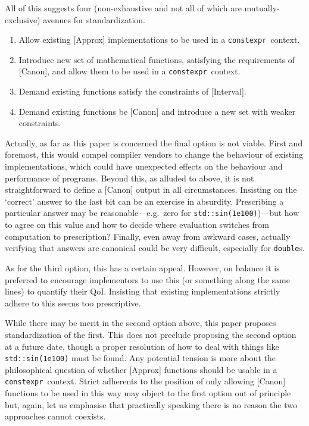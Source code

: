 \documentclass[prd,twocolumn,amsmath,amssymb,nofootinbib,eqsecnum]{revtex4-1}
\newcommand{\constexpr}{\code{constexpr}\xspace}
\newcommand{\code}[1]{{\tt #1}}
\begin{document}
All of this suggests four (non-exhaustive and not all of which are mutually-exclusive) avenues for standardization.
\begin{enumerate}
	\item Allow existing [Approx] implementations to be used in a \constexpr\ context.

	\item Introduce new set of mathematical functions, satisfying the requirements of [Canon], and
	allow them to be used in a \constexpr\ context.
	
	\item Demand existing functions satisfy the constraints of [Interval].
	
	\item Demand existing functions be [Canon] and introduce a new set with weaker constraints.
\end{enumerate}
Actually, as far as this paper is concerned the final option is not viable. First and foremost, this would compel compiler vendors to change the behaviour of existing implementations, which could have unexpected effects on the behaviour and performance of programs. Beyond this, as alluded to above, it is not straightforward to define a [Canon] output in all circumstances. Insisting on the `correct' answer to the last bit can be an exercise in absurdity. Prescribing a particular answer may be reasonable---e.g.\ zero for \code{std::sin(1e100)})---but how to agree on this value and how to decide where evaluation switches from computation to prescription? Finally, even away from awkward cases, actually verifying that answers are canonical could be very difficult, especially for \code{double}s.

As for the third option, this has a certain appeal. However, on balance it is preferred to encourage implementors to use this (or something along the same lines) to quantify their QoI. Insisting that existing implementations strictly adhere to this seems too prescriptive.

While there may be merit in the second option above, this paper proposes standardization of the first. This does not preclude proposing the second option at a future date, though a proper resolution of how to deal with things like \code{std::sin(1e100)} must be found. Any potential tension is more about the philosophical question of whether [Approx] functions should be usable in a \constexpr\ context. Strict adherents to the position of only allowing [Canon] functions to be used in this way may object to the first option out of principle but, again, let us emphasise that practically speaking there is no reason the two approaches cannot coexists.
\end{document}
